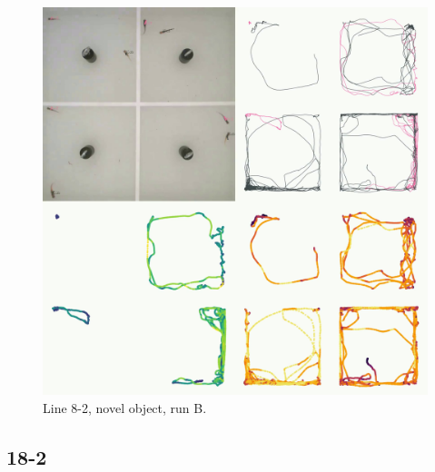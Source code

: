 \documentclass[
]{book}
\begin{document}
\begin{figure}
\includegraphics[width=1\linewidth]{figs/mikk_behaviour/four_panel_plots/novel_object_20191118_1224_8-2_R_B_300} \caption{Line 8-2, novel object, run B.}\label{fig:4p-8-2-no-B}
\end{figure}

\hypertarget{section-7}{%
\subsection{18-2}\label{section-7}}
\end{document}
